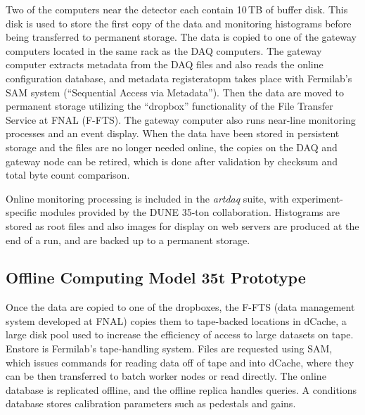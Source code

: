 \documentclass[12pt]{article}
\begin{document}
Two of the computers near the detector each contain 10\,TB of buffer disk.  This disk is used to store the first copy of
the data and monitoring histograms before being transferred to permanent storage. The data is copied
to one of the gateway computers located in the same rack as the DAQ computers.  The gateway computer
extracts metadata from the DAQ files and also reads the online configuration database, and 
metadata registeratopm takes place with Fermilab's  SAM system (``Sequential Access via Metadata'').
Then the data are moved to permanent storage utilizing the ``dropbox'' functionality of the File Transfer Service at FNAL (F-FTS).
The gateway computer also runs near-line monitoring processes and an event display.
When the data have been stored in persistent storage and the files are no longer needed online,
the copies on the DAQ and gateway node can be retired, which is done after validation by checksum and
total byte count comparison.

Online monitoring processing is included in the {\it artdaq} suite, with experiment-specific modules
provided by the DUNE 35-ton collaboration.  Histograms are stored as root files and also
images for display on web servers are produced at the end of a run, and are backed up
to a permanent storage.


\subsection{Offline Computing Model 35t Prototype}

Once the data are copied to one of the dropboxes, the F-FTS (data management system developed at FNAL)
copies them to tape-backed locations in dCache,
a large disk pool used to increase the efficiency of access to large datasets on tape.  Enstore is Fermilab's
tape-handling system.  Files are requested using SAM, which issues commands for reading data off of tape
and into dCache, where they can be then transferred to batch worker nodes or read directly.  
The online database is replicated offline, and the offline replica handles queries.  A conditions database
stores calibration parameters such as pedestals and gains.

\end{document}
